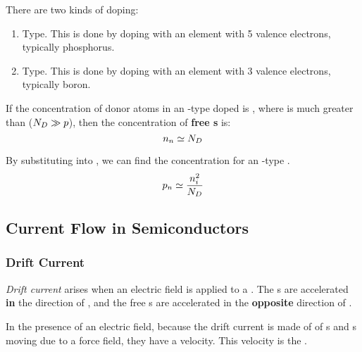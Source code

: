 There are two kinds of doping:
\begin{enumerate}[noitemsep]
\item \ElectronConcentration{} Type.
  This is done by doping with an element with 5 valence electrons, typically phosphorus.
\item \HoleConcentration{} Type.
  This is done by doping with an element with 3 valence electrons, typically boron.
\end{enumerate}

If the concentration of donor atoms in an \ElectronConcentration{}-type doped  is \DonorConcentration{}, where \DonorConcentration{} is much greater than \HoleElectronConcentration{} ($N_{D} \gg p$), then the concentration of \textbf{free s} is:
\begin{equation}\label{eq:n-Type_Donor_Concentration}
  n_{n} \simeq N_{D}
\end{equation}

By substituting  into , we can find the  concentration for an \ElectronConcentration{}-type .
\begin{equation}\label{eq:n-Type_Acceptor_Concentration}
  p_{n} \simeq \frac{n_{i}^{2}}{N_{D}}
\end{equation}


\subsection{Current Flow in Semiconductors}\label{subsec:Semiconductors_Current_Flow}
\subsubsection{Drift Current}\label{subsubsec:Drift_Current}
\begin{definition}\label{def:Drift_Current}
  \emph{Drift current} arises when an electric field \EField{} is applied to a .
  The s are accelerated \textbf{in} the direction of \EField{}, and the free s are accelerated in the \textbf{opposite} direction of \EField{}.
\end{definition}

In the presence of an electric field, because the drift current is made of of s and s moving due to a force field, they have a velocity.
This velocity is the .

